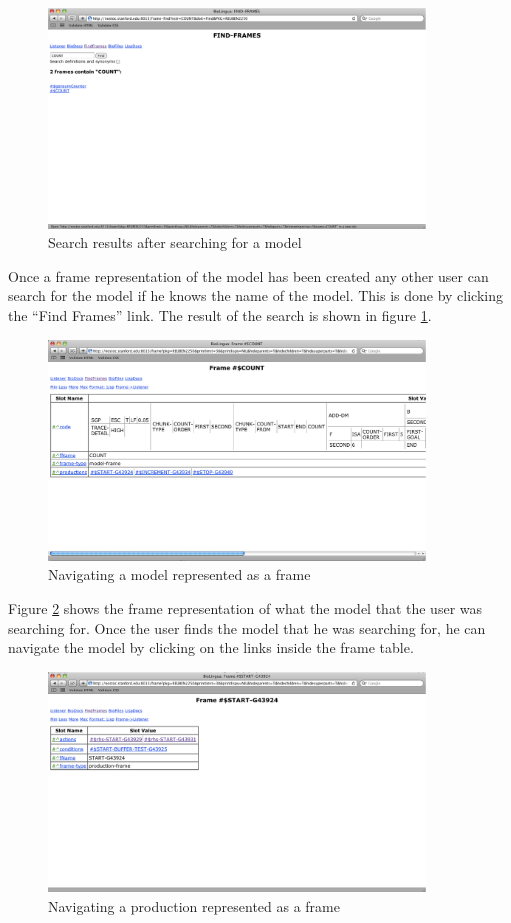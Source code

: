 \begin{figure}[htp]
  \centering
  \includegraphics[width=100mm]{SearchForModel}
  \caption{Search results after searching for a model}
  \label{SearchForModel}
\end{figure}

Once a frame representation of the model has been created any other
user can search for the model if he knows the name of the model. This
is done by clicking the ``Find Frames'' link. The result of the search
is shown in figure \ref{SearchForModel}.

\begin{figure}[htp]
  \centering
  \includegraphics[width=100mm]{NavigateFrame}
  \caption{Navigating a model represented as a frame}
  \label{NavigateFrame}
\end{figure}

Figure \ref{NavigateFrame} shows the frame representation of what the
model that the user was searching for. Once the user finds the model
that he was searching for, he can navigate the model by clicking on
the links inside the frame table.

\begin{figure}[htp]
  \centering
  \includegraphics[width=100mm]{NavigatingAProduction}
  \caption{Navigating a production represented as a frame}
  \label{NavigatingAProduction}
\end{figure}

